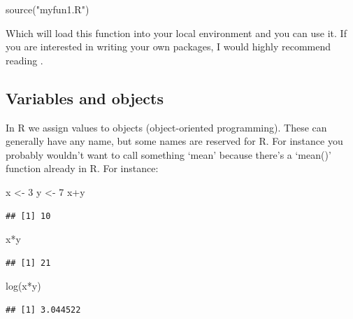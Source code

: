 \documentclass[
]{article}
\newenvironment{Shaded}{\begin{snugshade}}{\end{snugshade}}
\newcommand{\DecValTok}[1]{\textcolor[rgb]{0.00,0.00,0.81}{#1}}
\newcommand{\FunctionTok}[1]{\textcolor[rgb]{0.00,0.00,0.00}{#1}}
\newcommand{\NormalTok}[1]{#1}
\newcommand{\OtherTok}[1]{\textcolor[rgb]{0.56,0.35,0.01}{#1}}
\newcommand{\SpecialCharTok}[1]{\textcolor[rgb]{0.00,0.00,0.00}{#1}}
\newcommand{\StringTok}[1]{\textcolor[rgb]{0.31,0.60,0.02}{#1}}
\begin{document}
\begin{Shaded}
\begin{Highlighting}[]
\FunctionTok{source}\NormalTok{(}\StringTok{"myfun1.R"}\NormalTok{)}
\end{Highlighting}
\end{Shaded}

Which will load this function into your local environment and you can
use it. If you are interested in writing your own packages, I would
highly recommend reading \citet{Wickham}.

\hypertarget{variables-and-objects}{%
\subsection{Variables and objects}\label{variables-and-objects}}

In R we assign values to objects (object-oriented programming). These
can generally have any name, but some names are reserved for R. For
instance you probably wouldn't want to call something `mean' because
there's a `mean()' function already in R. For instance:

\begin{Shaded}
\begin{Highlighting}[]
\NormalTok{x }\OtherTok{\textless{}{-}} \DecValTok{3}
\NormalTok{y }\OtherTok{\textless{}{-}} \DecValTok{7}
\NormalTok{x}\SpecialCharTok{+}\NormalTok{y}
\end{Highlighting}
\end{Shaded}

\begin{verbatim}
## [1] 10
\end{verbatim}

\begin{Shaded}
\begin{Highlighting}[]
\NormalTok{x}\SpecialCharTok{*}\NormalTok{y}
\end{Highlighting}
\end{Shaded}

\begin{verbatim}
## [1] 21
\end{verbatim}

\begin{Shaded}
\begin{Highlighting}[]
\FunctionTok{log}\NormalTok{(x}\SpecialCharTok{*}\NormalTok{y)}
\end{Highlighting}
\end{Shaded}

\begin{verbatim}
## [1] 3.044522
\end{verbatim}
\end{document}
